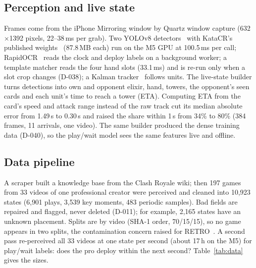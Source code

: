 \documentclass[conference]{IEEEtran}
\begin{document}
\subsection{Perception and live state}
Frames come from the iPhone Mirroring window by Quartz window capture (632$\times$1392 pixels, 22--38\,ms per grab). %
Two YOLOv8 detectors~\cite{jocher2023yolov8} with KataCR's published weights~\cite{wu2024katacr} (87.8\,MB each) run on the M5 GPU at 100.5\,ms per call; RapidOCR~\cite{rapidai2021rapidocr} reads the clock and deploy labels on a background worker; a template matcher reads the four hand slots (33.1\,ms) and is re-run only when a slot crop changes (D-038); a Kalman tracker~\cite{kalman1960} follows units. %
The live-state builder turns detections into own and opponent elixir, hand, towers, the opponent's seen cards and each unit's time to reach a tower (ETA). Computing ETA from the card's speed and attack range instead of the raw track cut its median absolute error from 1.49\,s to 0.30\,s and raised the share within 1\,s from 34\% to 80\% (384 frames, 11 arrivals, one video). %
The same builder produced the dense training data (D-040), so the play/wait model sees the same features live and offline.

\subsection{Data pipeline}
A scraper built a knowledge base from the Clash Royale wiki; then 197 games from 33 videos of one professional creator were perceived and cleaned into 10,923 states (6,901 plays, 3,539 key moments, 483 periodic samples). Bad fields are repaired and flagged, never deleted (D-011); for example, 2,165 states have an unknown placement. %
Splits are by video (SHA-1 order, 70/15/15), so no game appears in two splits, the contamination concern raised for RETRO~\cite{borgeaud2022retro}. A second pass re-perceived all 33 videos at one state per second (about 17\,h on the M5) for play/wait labels: does the pro deploy within the next second? %
Table~\ref{tab:data} gives the sizes.
\end{document}
